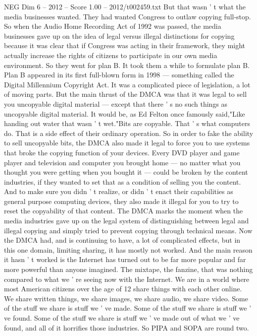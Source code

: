 \begin{textsample}{NEG Dim 6 – 2012 – Score 1.00 – 2012/t002459.txt}
But that wasn ' t what the media businesses wanted.
They had wanted Congress to outlaw copying full-stop.
So when the Audio Home Recording Act of 1992 was passed, the media businesses gave up on the idea of legal versus illegal distinctions for copying because it was clear that if Congress was acting in their framework, they might actually increase the rights of citizens to participate in our own media environment.
So they went for plan B.
It took them a while to formulate plan B.
Plan B appeared in its first full-blown form in 1998 — something called the Digital Millennium Copyright Act.
It was a complicated piece of legislation, a lot of moving parts.
But the main thrust of the DMCA was that it was legal to sell you uncopyable digital material — except that there ' s no such things as uncopyable digital material.
It would be, as Ed Felton once famously said,"Like handing out water that wasn ' t wet."Bits are copyable.
That ' s what computers do.
That is a side effect of their ordinary operation.
So in order to fake the ability to sell uncopyable bits, the DMCA also made it legal to force you to use systems that broke the copying function of your devices.
Every DVD player and game player and television and computer you brought home — no matter what you thought you were getting when you bought it — could be broken by the content industries, if they wanted to set that as a condition of selling you the content.
And to make sure you didn ' t realize, or didn ' t enact their capabilities as general purpose computing devices, they also made it illegal for you to try to reset the copyability of that content.
The DMCA marks the moment when the media industries gave up on the legal system of distinguishing between legal and illegal copying and simply tried to prevent copying through technical means.
Now the DMCA had, and is continuing to have, a lot of complicated effects, but in this one domain, limiting sharing, it has mostly not worked.
And the main reason it hasn ' t worked is the Internet has turned out to be far more popular and far more powerful than anyone imagined.
The mixtape, the fanzine, that was nothing compared to what we ' re seeing now with the Internet.
We are in a world where most American citizens over the age of 12 share things with each other online.
We share written things, we share images, we share audio, we share video.
Some of the stuff we share is stuff we ' ve made.
Some of the stuff we share is stuff we ' ve found.
Some of the stuff we share is stuff we ' ve made out of what we ' ve found, and all of it horrifies those industries.
So PIPA and SOPA are round two.

\end{textsample}

